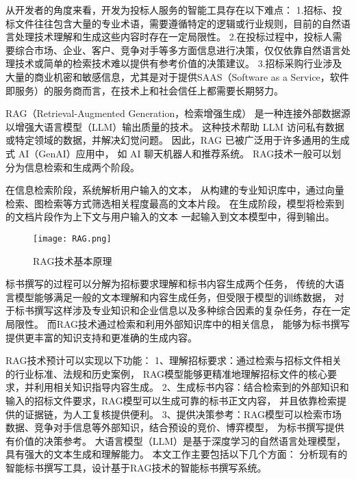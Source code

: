 \documentclass{xmu}
\begin{document}
从开发者的角度来看，开发为投标人服务的智能工具存在以下难点：
1.招标、投标文件往往包含大量的专业术语，需要遵循特定的逻辑或行业规则，目前的自然语言处理技术理解和生成这些内容时存在一定局限性。
2.在投标过程中，投标人需要综合市场、企业、客户、竞争对手等多方面信息进行决策，仅仅依靠自然语言处理技术或简单的检索技术难以提供有参考价值的决策建议。
3.招标采购行业涉及大量的商业机密和敏感信息，尤其是对于提供SAAS（Software as a Service，软件即服务）的服务商而言，在技术上和社会信任上都需要长期努力。

RAG（Retrieval-Augmented Generation，检索增强生成）
是一种连接外部数据源以增强大语言模型（LLM）输出质量的技术。
这种技术帮助 LLM 访问私有数据或特定领域的数据，并解决幻觉问题。
因此，RAG 已被广泛用于许多通用的生成式 AI（GenAI）应用中，
如 AI 聊天机器人和推荐系统。
RAG技术一般可以划分为信息检索和生成两个阶段。

在信息检索阶段，系统解析用户输入的文本，
从构建的专业知识库中，通过向量检索、图检索等方式筛选相关程度最高的文本片段。
在生成阶段，模型将检索到的文档片段作为上下文与用户输入的文本
一起输入到文本模型中，得到输出。
\begin{figure}[!htb]
    \centering
    \texttt{[image: RAG.png]}\\
    \caption{RAG技术基本原理}\label{ragyuanli}
\end{figure}
标书撰写的过程可以分解为招标要求理解和标书内容生成两个任务，
传统的大语言模型能够满足一般的文本理解和内容生成任务，但受限于模型的训练数据，
对于标书撰写这样涉及专业知识和企业信息以及多种综合因素的复杂任务，存在一定局限性。
而RAG技术通过检索和利用外部知识库中的相关信息，
能够为标书撰写提供更丰富的知识支持和更准确的生成内容。

RAG技术预计可以实现以下功能：
1、理解招标要求：通过检索与招标文件相关的行业标准、法规和历史案例，
RAG模型能够更精准地理解招标文件的核心要求，并利用相关知识指导内容生成。
2、生成标书内容：结合检索到的外部知识和输入的招标文件要求，RAG模型可以生成可靠的标书正文内容，
并且依靠检索提供的证据链，为人工复核提供便利。
3、提供决策参考：RAG模型可以检索市场数据、竞争对手信息等外部知识，结合预设的竞价、博弈模型，
为标书撰写提供有价值的决策参考。
大语言模型（LLM）是基于深度学习的自然语言处理模型，具有强大的文本生成和理解能力。
本文工作主要包括以下几个方面：
分析现有的智能标书撰写工具，设计基于RAG技术的智能标书撰写系统。
\end{document}
